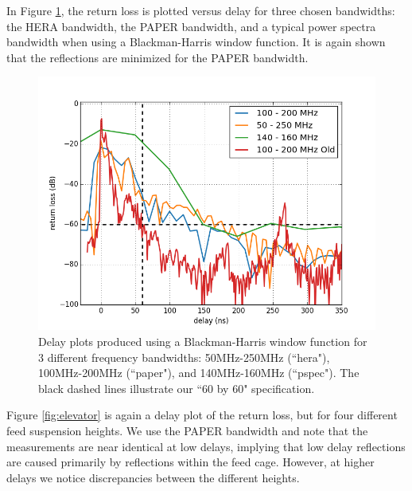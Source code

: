 \documentclass[12pt,preprint]{aastex}
\begin{document}
In Figure \ref{fig:3bands}, the return loss is plotted versus delay for three chosen bandwidths: the HERA bandwidth, the PAPER bandwidth, and a typical power spectra bandwidth when using a Blackman-Harris window function. It is again shown that the reflections are minimized for the PAPER bandwidth. 

\begin{figure}
\centering
\includegraphics[totalheight=0.4\textheight]{plots/delay3_window.png}
\caption{Delay plots produced using a Blackman-Harris window function for 3 different frequency bandwidths: 50MHz-250MHz (``hera"), 100MHz-200MHz (``paper"), and 140MHz-160MHz (``pspec"). The black dashed lines illustrate our ``60 by 60" specification.}
\label{fig:3bands}
\end{figure}

Figure \ref{fig:elevator} is again a delay plot of the return loss, but for four different feed suspension heights. We use the PAPER bandwidth and note that the measurements are near identical at low delays, implying that low delay reflections are caused primarily by reflections within the feed cage. However, at higher delays we notice discrepancies between the different heights.
\end{document}
